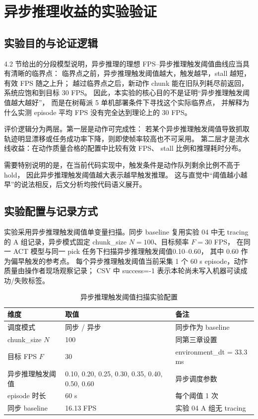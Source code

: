 \section{异步推理收益的实验验证}\label{sec:async-exp}

\subsection{实验目的与论证逻辑}\label{sec:async-exp-purpose}

4.2 节给出的分段模型说明，异步推理的理想 FPS--异步推理触发阈值曲线应当具有清晰的临界点：
临界点之前，异步推理触发阈值越大，触发越早，stall 越短，有效 FPS 随之上升；
越过临界点之后，新动作 chunk 能在旧队列耗尽前返回，系统应饱和到目标 30 FPS。
因此，本实验的核心目的不是证明``异步推理触发阈值越大越好''，
而是在树莓派 5 单机部署条件下寻找这个实际临界点，
并解释为什么实测 episode 平均 FPS 没有完全达到理论上的 30 FPS。

评价逻辑分为两层。第一层是动作可完成性：
若某个异步推理触发阈值导致抓取轨迹明显漂移或任务成功率下降，则即使帧率较高也不可采用。
第二层才是流水线收益：在动作质量合格的配置中比较有效 FPS、
stall 比例和推理耗时分布。

需要特别说明的是，在当前代码实现中，触发条件是动作队列剩余比例不高于 hold，
因此异步推理触发阈值越大表示越早触发推理。
这与直觉中``阈值越小越早''的说法相反，后文分析均按代码语义展开。

\subsection{实验配置与记录方式}\label{sec:async-exp-design}

实验采用异步推理触发阈值单变量扫描。同步 baseline 复用实验 04 中无 tracing 的
A 组记录，异步模式固定 chunk\_size $N=100$、目标频率 $F=30$ FPS，
在同一 ACT 模型与同一 pick 任务下扫描异步推理触发阈值0.10--0.60，
其中 0.60 作为偏早触发的参考点。
每个异步推理触发阈值当前采集 1 个 60 s episode，动作质量由操作者现场观察记录；
CSV 中 success=-1 表示本轮尚未写入机器可读成功/失败标签。

\begin{table}[htbp]
  \centering
  \caption{异步推理触发阈值扫描实验配置}
  \label{tab:async-exp-config}
  \begin{tabularx}{\textwidth}{@{}p{}Xp{}@{}}
  \toprule
  维度 & 取值 & 备注 \\
  \midrule
  调度模式 & 同步 / 异步 & 同步作为 baseline \\
  chunk\_size $N$ & 100 & 同第三章设置 \\
  目标 FPS $F$ & 30 & environment\_dt = 33.3 ms \\
  异步推理触发阈值 & 0.10, 0.20, 0.25, 0.30, 0.35, 0.40, 0.50, 0.60 & 异步调度参数 \\
  episode 时长 & 60 s & 每个阈值 1 次 \\
  同步 baseline & 16.13 FPS & 实验 04 A 组无 tracing \\
  \bottomrule
  \end{tabularx}
\end{table}

